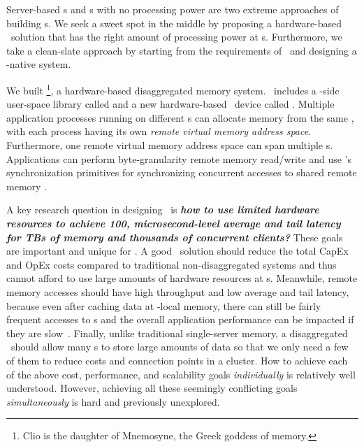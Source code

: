 Server-based \MN{}s and \MN{}s with no processing power are two extreme approaches of building \MN{}s.
We seek a sweet spot in the middle by proposing a hardware-based \md\ solution that has the right amount of processing power at \MN{}s.
Furthermore, we take a clean-slate approach by starting from the requirements of \md\
and designing a \md-native system.


We built {\em \sys}\footnote{Clio is the daughter of Mnemosyne, the Greek goddess of memory.}, a hardware-based disaggregated memory system.
\sys\ includes a \CN-side user-space library called {\em \syslib}
and a new hardware-based \MN\ device called {\em \sysboard}.
Multiple application processes running on different \CN{}s can allocate memory from the same \sysboard, with each process having its own {\em remote virtual memory address space}.
Furthermore, one remote virtual memory address space can span multiple \sysboard{}s.
Applications can perform byte-granularity remote memory read/write and use \sys's synchronization primitives for synchronizing concurrent accesses to shared remote memory .

A key research question in designing \sys\ is \textit{\textbf{how to use limited hardware resources to achieve 100\Gbps, microsecond-level average and tail latency for TBs of memory and thousands of concurrent clients?}}
These goals are important and unique for \md.
A good \md\ solution should reduce the total CapEx and OpEx costs compared to traditional non-disaggregated systems and thus cannot afford to use large amounts of hardware resources at \MN{}s.
Meanwhile, remote memory accesses should have high throughput and low average and tail latency, because even after caching data at \CN-local memory, there can still be fairly frequent accesses to \MN{}s and the overall application performance can be impacted if they are slow~\cite{disagg-osdi16}.
Finally, unlike traditional single-server memory, a disaggregated \MN\ should allow many \CN{}s to store large amounts of data so that we only need a few of them to reduce costs and connection points in a cluster.
How to achieve each of the above cost, performance, and scalability goals {\em individually} is relatively well understood.
However, achieving all these seemingly conflicting goals {\em simultaneously} is hard and previously unexplored.

